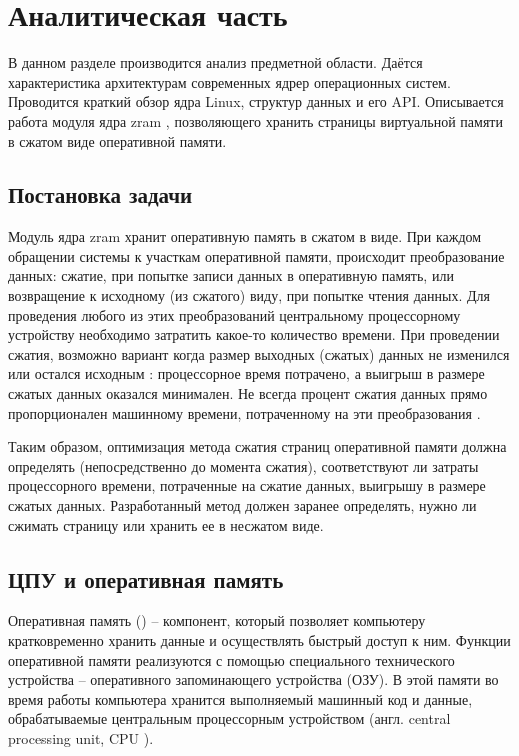 \section{Аналитическая часть}

В данном разделе производится анализ предметной области. Даётся характеристика архитектурам современных ядрер операционных систем. Проводится краткий обзор ядра Linux, структур данных и его API. Описывается работа модуля ядра zram \cite{zram}, позволяющего хранить страницы виртуальной памяти в сжатом виде оперативной памяти.

\subsection{Постановка задачи}

Модуль ядра zram хранит оперативную память в сжатом в виде. При каждом обращении системы к участкам оперативной памяти, происходит преобразование данных: сжатие, при попытке записи данных в оперативную память, или возвращение к исходному (из сжатого) виду, при попытке чтения данных. Для проведения любого из этих преобразований центральному процессорному устройству необходимо затратить какое-то количество времени. При проведении сжатия, возможно вариант когда размер выходных (сжатых) данных не изменился или остался исходным \cite{data-compression}: процессорное время потрачено, а выигрыш в размере сжатых данных оказался минимален. Не всегда процент сжатия данных прямо пропорционален машинному времени, потраченному на эти преобразования \cite{data-compression}.

Таким образом, оптимизация метода сжатия страниц оперативной памяти должна определять (непосредственно до момента сжатия), соответствуют ли затраты процессорного времени, потраченные на сжатие данных, выигрышу в размере сжатых данных. Разработанный метод должен заранее определять, нужно ли сжимать страницу или хранить ее в несжатом виде.

\subsection{ЦПУ и оперативная память} 

Оперативная память (\cite{ram}) -- компонент, который позволяет компьютеру кратковременно хранить данные и осуществлять быстрый доступ к ним. Функции оперативной памяти реализуются с помощью специального технического устройства -- оперативного запоминающего устройства (ОЗУ). В этой памяти во время работы компьютера хранится выполняемый машинный код и данные, обрабатываемые центральным процессорным устройством (англ. central processing unit, CPU \cite{cpu}).

